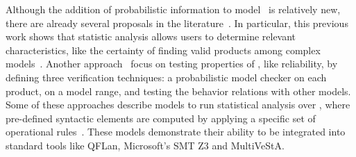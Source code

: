 %		
%				
%				
%		
%	
%	
%
%
Although the addition of probabilistic information to model \SPLs\ is relatively new, there are already several proposals in the literature~\cite{chssgl13,tllv15,tlll15,dpcslsh17}. In particular, this previous work shows that statistic analysis allows users to determine relevant characteristics, like the certainty of finding valid products among complex models~\cite{dpcslsh17}.
%
Another approach~\cite{chssgl13} focus on testing properties of \SPLs, like reliability, by defining three verification techniques: a probabilistic model checker on each product, on a model range, and testing the behavior relations with other models.
%
Some of these approaches describe models to run statistical analysis over \SPLs, where pre-defined syntactic elements are computed by applying a specific set of operational rules~\cite{tllv15,tlll15}. These models demonstrate their ability to be integrated into standard tools like QFLan, Microsoft's SMT Z3 and MultiVeStA.
%
%

